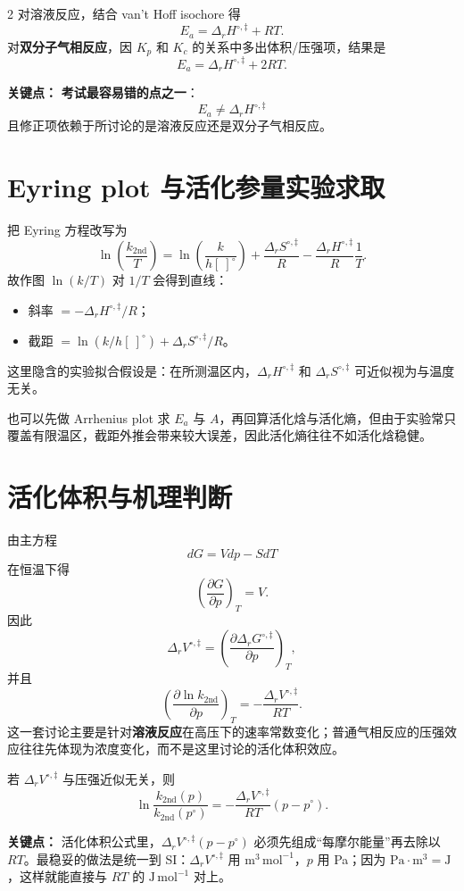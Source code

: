 \documentclass[a4paper,9pt]{article}
\newenvironment{keypoint}
{\par\vspace{0.3em}\noindent\begin{tcolorbox}[colback=keybg,colframe=keycolor,boxrule=0.5pt,arc=2pt,left=2pt,right=2pt,top=2pt,bottom=2pt,boxsep=0pt]\noindent\textcolor{keycolor}{\textbf{关键点：}}}
{\end{tcolorbox}\par\vspace{0.3em}}
\begin{document}
\begin{multicols}{2}
对溶液反应，结合 van't Hoff isochore 得
\[
E_a=\Delta_rH^{\circ,\ddagger}+RT.
\]
对\textbf{双分子气相反应}，因 $K_p$ 和 $K_c$ 的关系中多出体积/压强项，结果是
\[
E_a=\Delta_rH^{\circ,\ddagger}+2RT.
\]

\begin{keypoint}
\textbf{考试最容易错的点之一}：
\[
E_a \neq \Delta_rH^{\circ,\ddagger}
\]
且修正项依赖于所讨论的是溶液反应还是双分子气相反应。
\end{keypoint}

\section{Eyring plot 与活化参量实验求取}

把 Eyring 方程改写为
\[
\ln\left(\frac{k_{2\mathrm{nd}}}{T}\right)
=\ln\left(\frac{k}{h[\ ]^\circ}\right)
+\frac{\Delta_rS^{\circ,\ddagger}}{R}
-\frac{\Delta_rH^{\circ,\ddagger}}{R}\frac{1}{T}.
\]
故作图 $\ln(k/T)$ 对 $1/T$ 会得到直线：
\begin{itemize}
  \item 斜率 $=-\Delta_rH^{\circ,\ddagger}/R$；
  \item 截距 $=\ln(k/h[\ ]^\circ)+\Delta_rS^{\circ,\ddagger}/R$。
\end{itemize}
这里隐含的实验拟合假设是：在所测温区内，$\Delta_rH^{\circ,\ddagger}$ 和 $\Delta_rS^{\circ,\ddagger}$ 可近似视为与温度无关。

也可以先做 Arrhenius plot 求 $E_a$ 与 $A$，再回算活化焓与活化熵，但由于实验常只覆盖有限温区，截距外推会带来较大误差，因此活化熵往往不如活化焓稳健。

\section{活化体积与机理判断}

由主方程
\[
dG=Vdp-SdT
\]
在恒温下得
\[
\left(\frac{\partial G}{\partial p}\right)_T=V.
\]
因此
\[
\Delta_rV^{\circ,\ddagger}=\left(\frac{\partial \Delta_rG^{\circ,\ddagger}}{\partial p}\right)_T,
\]
并且
\[
\left(\frac{\partial \ln k_{2\mathrm{nd}}}{\partial p}\right)_T
=-\frac{\Delta_rV^{\circ,\ddagger}}{RT}.
\]
这一套讨论主要是针对\textbf{溶液反应}在高压下的速率常数变化；普通气相反应的压强效应往往先体现为浓度变化，而不是这里讨论的活化体积效应。

若 $\Delta_rV^{\circ,\ddagger}$ 与压强近似无关，则
\[
\ln\frac{k_{2\mathrm{nd}}(p)}{k_{2\mathrm{nd}}(p^\circ)}
=-\frac{\Delta_rV^{\circ,\ddagger}}{RT}(p-p^\circ).
\]

\begin{keypoint}
	活化体积公式里，$\Delta_rV^{\circ,\ddagger}(p-p^\circ)$ 必须先组成“每摩尔能量”再去除以 $RT$。最稳妥的做法是统一到 SI：$\Delta_rV^{\circ,\ddagger}$ 用 $\mathrm{m^3\,mol^{-1}}$，$p$ 用 Pa；因为 $\mathrm{Pa\cdot m^3=J}$，这样就能直接与 $RT$ 的 $\mathrm{J\,mol^{-1}}$ 对上。
\end{keypoint}


\end{multicols}
\end{document}
